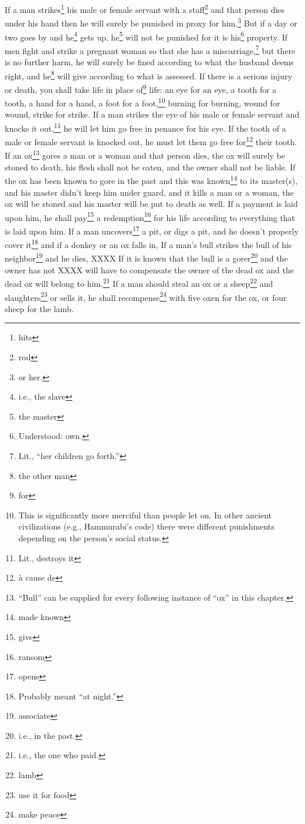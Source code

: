 \begin{enumerate}
     If a man strikes\footnote{hits} his male or female servant with a staff\footnote{rod} and that person dies under his hand then he will surely be punished in proxy for him.\footnote{or her.}%
     But if a day or two goes by and he\footnote{i.e., the slave} gets up, he\footnote{the master} will not be punished for it is his\footnote{Understood: own.} property.%
     If men fight and strike a pregnant woman so that she has a miscarriage,\footnote{Lit., ``her children go forth.''} but there is no further harm, he will surely be fined according to what the husband deems right, and he\footnote{the other man} will give according to what is assessed.%
     If there is a serious injury or death, you shall take life in place of\footnote{for} life:%
     an eye for an eye, a tooth for a tooth, a hand for a hand, a foot for a foot,\footnote{This is significantly more merciful than people let on. In other ancient civilizations (e.g., Hammurabi's code) there were different punishments depending on the person's social status.}%
     burning for burning, wound for wound, strike for strike.%
     If a man strikes the eye of his male or female servant and knocks it out,\footnote{Lit., destroys it} he will let him go free in penance for his eye.%
     If the tooth of a male or female servant is knocked out, he must let them go free for\footnote{\`a cause de} their tooth.%
     If an ox\footnote{``Bull'' can be supplied for every following instance of ``ox'' in this chapter.} gores a man or a woman and that person dies, the ox will surely be stoned to death, his flesh shall not be eaten, and the owner shall not be liable.%
     If the ox has been known to gore in the past and this was known\footnote{made known} to its master(s), and his master didn't keep him under guard, and it kills a man or a woman, the ox will be stoned and his master will be put to death as well.%
     If a payment is laid upon him, he shall pay\footnote{give} a redemption\footnote{ransom} for his life according to everything that is laid upon him.%
     If a man uncovers\footnote{opens} a pit, or digs a pit, and he doesn't properly cover it\footnote{Probably meant ``at night.''} and if a donkey or an ox falls in,%
     If a man's bull strikes the bull of his neighbor\footnote{associate} and he dies, XXXX%
     If it is known that the bull is a gorer\footnote{i.e., in the past.} and the owner has not XXXX will have to compensate the owner of the dead ox and the dead ox will belong to him.\footnote{i.e., the one who paid.}%
     If a man should steal an ox or a sheep\footnote{lamb} and slaughters\footnote{use it for food} or sells it, he shall recompense\footnote{make peace} with five oxen for the ox, or four sheep for the lamb.%
\end{enumerate}
